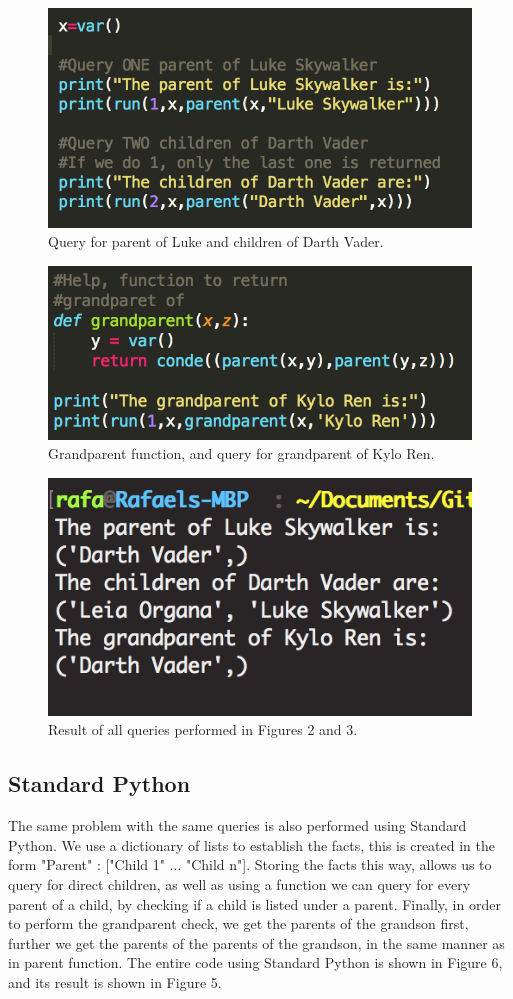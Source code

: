 \documentclass[12pt, letter]{article}
\begin{document}
 \begin{figure}[htb]
  \centering
  \includegraphics[width=0.70 \textwidth]{./figures/query_ld.png}
  \caption{Query for parent of Luke and children of Darth Vader.}
\end{figure}

 \begin{figure}[htb]
  \centering
  \includegraphics[width=0.65 \textwidth]{./figures/kylo.png}
  \caption{Grandparent function, and query for grandparent of Kylo Ren.}
\end{figure}

 \begin{figure}[htb]
  \centering
  \includegraphics[width=0.50 \textwidth]{./figures/result_log.png}
  \caption{Result of all queries performed in Figures 2 and 3.}
\end{figure}

\FloatBarrier

\subsection{Standard Python}

The same problem with the same queries is also performed using Standard Python. We use a dictionary of lists to establish the facts, this is created in the form "Parent" : ["Child 1" ... "Child n"]. Storing the facts this way, allows us to query for direct children, as well as using a function we can query for every parent of a child, by checking if a child is listed under a parent. Finally, in order to perform the grandparent check, we get the parents of the grandson first, further we get the parents of the parents of the grandson, in the same manner as in parent function. The entire code using Standard Python is shown in Figure 6, and its result is shown in Figure 5. 
\end{document}
